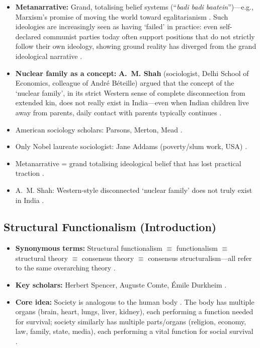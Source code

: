 \begin{CriticalPoint}
\begin{itemize}
    \item \textbf{Metanarrative:} Grand, totalising belief systems (``\textit{badi badi baatein}'')---e.g., Marxism's promise of moving the world toward egalitarianism . Such ideologies are increasingly seen as having `failed' in practice: even self-declared communist parties today often support positions that do not strictly follow their own ideology, showing ground reality has diverged from the grand ideological narrative .
    \item \textbf{Nuclear family as a concept:} \textbf{A.~M. Shah} (sociologist, Delhi School of Economics, colleague of André Béteille) argued that the concept of the `nuclear family', in its strict Western sense of complete disconnection from extended kin, does not really exist in India---even when Indian children live away from parents, daily contact with parents typically continues .
\end{itemize}
\end{CriticalPoint}

\begin{QuickRevision}
\begin{itemize}
    \item American sociology scholars: Parsons, Merton, Mead .
    \item Only Nobel laureate sociologist: Jane Addams (poverty/slum work, USA) .
    \item Metanarrative = grand totalising ideological belief that has lost practical traction .
    \item A.~M. Shah: Western-style disconnected `nuclear family' does not truly exist in India .
\end{itemize}
\end{QuickRevision}

\subsection{Structural Functionalism (Introduction)}

\begin{CriticalPoint}
\begin{itemize}
    \item \textbf{Synonymous terms:} Structural functionalism $\equiv$ functionalism $\equiv$ structural theory $\equiv$ consensus theory $\equiv$ consensus structuralism---all refer to the same overarching theory .
    \item \textbf{Key scholars:} Herbert Spencer, Auguste Comte, Émile Durkheim .
    \item \textbf{Core idea:} Society is analogous to the human body . The body has multiple organs (brain, heart, lungs, liver, kidney), each performing a function needed for survival; society similarly has multiple parts/organs (religion, economy, law, family, state, media), each performing a vital function for social survival .
\end{itemize}
\end{CriticalPoint}

